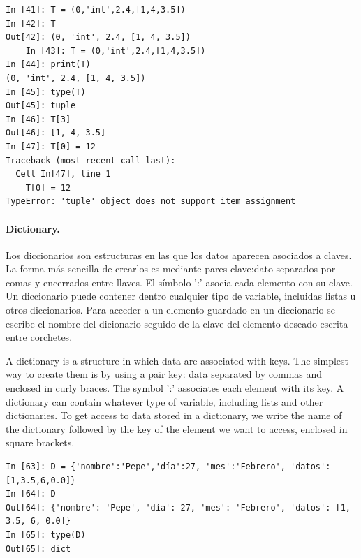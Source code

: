 \begin{center}
\begin{minipage}{0.4\textwidth}
\begin{verbatim}
In [41]: T = (0,'int',2.4,[1,4,3.5])
In [42]: T
Out[42]: (0, 'int', 2.4, [1, 4, 3.5])
    In [43]: T = (0,'int',2.4,[1,4,3.5])
In [44]: print(T)
(0, 'int', 2.4, [1, 4, 3.5])
In [45]: type(T)
Out[45]: tuple
In [46]: T[3]
Out[46]: [1, 4, 3.5]
In [47]: T[0] = 12
Traceback (most recent call last):
  Cell In[47], line 1
    T[0] = 12
TypeError: 'tuple' object does not support item assignment

\end{verbatim}
\end{minipage}
\end{center}

\begin{paracol}{2}
\paragraph{Dictionary.} Los diccionarios son estructuras en las que los datos aparecen asociados a claves. La forma más sencilla de crearlos es mediante pares clave:dato separados por comas y encerrados entre llaves. El símbolo ':' asocia cada elemento con su clave. Un diccionario puede contener dentro cualquier tipo de variable, incluidas listas u otros diccionarios. Para acceder a un elemento guardado en un diccionario se escribe el nombre del dicionario seguido de la clave del elemento deseado escrita entre corchetes.

\switchcolumn
A dictionary is a structure in which data are associated with keys. The simplest way to create them is by using a pair key: data separated by commas and enclosed in curly braces. The symbol ':' associates each element with its key. A dictionary can contain whatever type of variable, including lists and other dictionaries. To get access to data stored in a dictionary, we write the name of the dictionary followed by the key of the element we want to access, enclosed in square brackets.
\end{paracol}


\begin{verbatim}
In [63]: D = {'nombre':'Pepe','día':27, 'mes':'Febrero', 'datos':[1,3.5,6,0.0]}
In [64]: D
Out[64]: {'nombre': 'Pepe', 'día': 27, 'mes': 'Febrero', 'datos': [1, 3.5, 6, 0.0]}
In [65]: type(D)
Out[65]: dict
\end{verbatim}        


